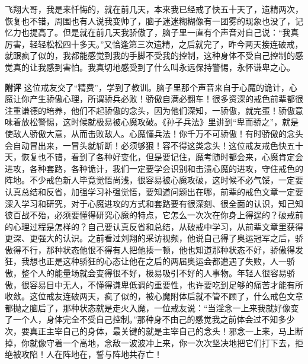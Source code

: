 \begin{case}
    飞翔大哥，我是来忏悔的，就在前几天，本来我已经戒了快五十天了，遗精两次，恢复也不错，周围也有人说我变帅了，脑子迷迷糊糊像有一团雾的现象也没了，记忆力也提高了。但是就在前几天我骄傲了，脑子里一直有个声音对自己说：“我真厉害，轻轻松松四十多天。”又恰逢第三次遗精，之后就完了，昨今两天接连破戒，就跟疯了似的，我都能感觉到我的手脚不受我的控制，这种身体不受自己控制的感觉真的让我感到害怕。我真切地感受到了什么叫永远保持警惕，永怀谦卑之心。

    \textbf{附评} 这位戒友交了“精费”，学到了教训。脑子里那个声音来自于心魔的诡计，心魔让你产生骄傲心理，所谓骄兵必败！骄傲自满必翻车！很多资深的戒色前辈都很注重谦德的培养，他们不起骄傲的念头，因为他们深知，一骄傲，就完蛋！骄傲意味着放松警惕，这时候就极易被心魔攻破。《孙子兵法》里讲到“卑而骄之”，就是使敌人骄傲大意，从而击败敌人。心魔懂兵法！你千万不可骄傲！有时骄傲的念头会自动冒出来，一冒头就斩断！必须够狠！容不得这类念头！这位戒友戒色快五十天，恢复也不错，看到了各种好变化，但是要记住，魔考随时都会来，心魔肯定会进攻，各种套路，各种诡计，我们一定要学会识别和击溃心魔的进攻，守住戒色的阵地。不少戒色新人毕竟觉悟尚浅，很容易被心魔攻破，这时候不必气馁，一定要认真总结和反省，加强学习补强觉悟，要知道问题出在哪，前辈的戒色文章一定要深入学习和研究，对于心魔进攻的方式和套路要有很深刻、很全面的认识，知己知彼百战不殆，必须要懂得研究心魔的特点，它怎么一次次在你身上得逞的？破戒前的心理过程是怎样的？自己要认真反省和总结，从破戒中学习，从前辈文章里获得更深、更强大的认识。之前看过刘翔的采访视频，他说自己得了奥运冠军之后，骄傲得不行，那种状态他恨不得有人把他揍一顿，他也知道那种状态不好，骄傲得发狂，我想也正是这种骄狂的心态让他在之后的两届奥运会都遭遇了失败，人一骄傲，整个人的能量场就会变得很不好，极易吸引不好的人事物。年轻人很容易骄傲，很容易目中无人，不懂得谦卑低调的重要性，也许要吃到足够的痛苦才能有所收敛。这位戒友连破两天，疯了似的，被心魔附体后就不管不顾了，什么戒色文章都抛之脑后了，那种状态就是走火入魔，一位戒友说：“当淫念一上来我就好像变了一个人，身体完全不受自己控制。”那种身不由己的感觉我之前体会过不知多少次，要真正主宰自己的身体，最关键的就是主宰自己的念头！邪念一上来，马上断掉，你就像守着一个高地，念敌一波波冲上来，你一次次坚决地把它们打下去，拒绝被攻陷！人在阵地在，誓与阵地共存亡！
\end{case}

